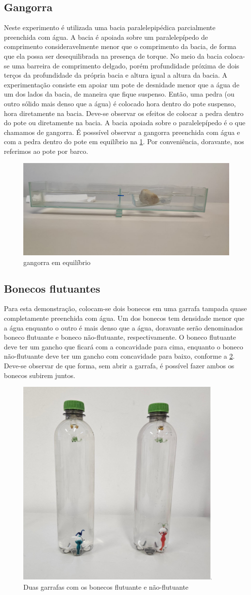 \subsection{Gangorra}
Neste experimento é utilizada uma bacia paralelepipédica parcialmente preenchida
com água. A bacia é apoiada sobre um paralelepípedo de comprimento
consideravelmente menor que o comprimento da bacia, de forma que ela possa ser
desequilibrada na presença de torque. No meio da bacia coloca-se uma barreira de
comprimento delgado, porém profundidade próxima de dois terços da profundidade
da própria bacia e altura igual a altura da bacia. A experimentação consiste em
apoiar um pote de desnidade menor que a água de um dos lados da bacia, de
maneira que fique suspenso. Então, uma pedra (ou outro sólido mais denso que a
água) é colocado hora dentro do pote suspenso, hora diretamente na bacia.
Deve-se observar os efeitos de colocar a pedra dentro do pote ou diretamente na
bacia. A bacia apoiada sobre o paralelepípedo é o que chamamos de gangorra. É posssível observar 
a gangorra preenchida com água e com a pedra dentro do pote em equilíbrio na \cref{gangorra.png}.
Por conveniência, doravante, nos referimos ao pote por barco.  
\begin{figure}[H]
    \centering
    \includegraphics[width=.35\linewidth]{fig/gangorra.jpeg}
    \caption{gangorra em equilíbrio}
    \label{gangorra.png}
\end{figure}

\subsection{Bonecos flutuantes}
Para esta demonstração, colocam-se dois bonecos em uma garrafa tampada quase
completamente preenchida com água. Um dos bonecos tem densidade menor que a água
enquanto o outro é mais denso que a água, doravante serão denominados boneco 
flutuante e boneco não-flutuante, respectivamente. O boneco flutuante deve
ter um gancho que ficará com a concavidade para cima, enquanto o boneco não-flutuante
deve ter um gancho com concavidade para baixo, conforme a \cref{bonecos.png}. Deve-se observar de que
forma, sem abrir a garrafa, é possível fazer ambos os bonecos subirem juntos. 
\begin{figure}[H]
    \centering
    \includegraphics[width=.25\linewidth]{fig/bonecos.png}
    \caption{Duas garrafas com os bonecos flutuante e não-flutuante}
    \label{bonecos.png}
\end{figure}

